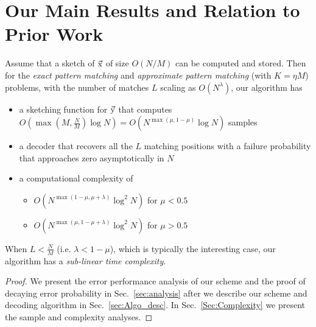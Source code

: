 \section{Our Main Results and Relation to Prior Work}
\label{sec:mainresults}
\begin{theorem}
Assume that a sketch of $\vec{\mathrm{x}}$ of size $O(N/M)$ can be computed and stored. Then for the {\it exact pattern matching} and {\it approximate pattern matching} (with $K = \eta M$) problems, with the number of matches $L$ scaling as $O(N^{\lambda})$, our algorithm has
\begin{itemize}
 \item a sketching function for $\vec{\mathrm{y}}$ that computes $O(\max(M,\frac{N}{M})\log N)=O(N^{\max(\mu,1-\mu)}\log N)$ samples
 \item a decoder that recovers all the $L$ matching positions with a failure probability that approaches zero asymptotically in $N$
 \item a computational complexity of
 \begin{itemize}
 \item  $O(N^{\max(1-\mu,\mu+\lambda)}\log^2 N)$ for $\mu<0.5$
  \item  $O(N^{\max(\mu,1-\mu+\lambda)}\log^2 N)$ for $\mu>0.5$
\end{itemize}
 \end{itemize}
When $L<\frac{N}{M}$ (i.e. $\lambda<1-\mu$), which is typically the interesting case, our algorithm has a {\it sub-linear time complexity}.
\end{theorem}
\begin{proof}
We present the error performance analysis of our scheme and the proof of decaying error probability in Sec.~\ref{sec:analysis} after we describe our scheme and  decoding algorithm in Sec.~\ref{sec:Algo_desc}. In Sec.~\ref{Sec:Complexity} we present the sample and complexity analyses.
\end{proof}
